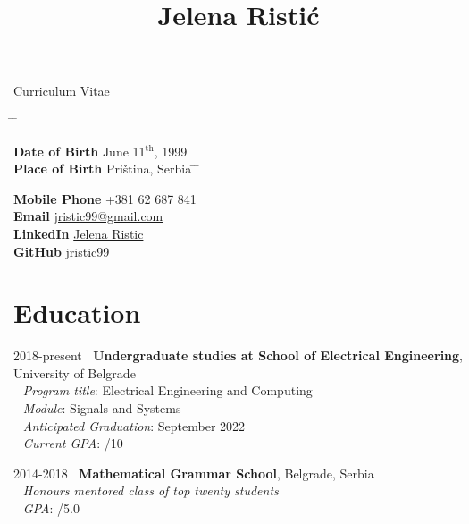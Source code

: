 \documentclass[10pt]{article}
\begin{document}
\pagestyle{empty}

\title{Jelena Ristić} \hfill Curriculum Vitae



\setlength{\TPHorizModule}{1mm}
\setlength{\TPVertModule}{1mm}

\parbox{0.5\textwidth}{ 
\begin{tabbing} 
\hspace{3cm} \= \hspace{1cm} \= \kill 


{\bf Date of Birth} \>  June 11$^\text{th}$, 1999 \\ 
{\bf Place of Birth} \> Priština, Serbia 
\hspace{3cm} \= \hspace{4cm} \= \kill %

{\bf Mobile Phone} \> +381 62 687 841 \\ %
{\bf Email} \> \href{mailto:jristic99@gmail.com}{jristic99@gmail.com} \\ %
{\bf LinkedIn} \> \href{https://www.linkedin.com/in/jristic99/}{Jelena Ristic} \\
{\bf GitHub} \> \href{https://github.com/jristic99}{jristic99}

\end{tabbing}}



\section{Education}
\tabbedblock
{
2018-present \> $\:$  \textbf{Undergraduate studies at School of Electrical Engineering}, University of Belgrade\\[2pt]
\>\+
$\:$ $\:$\textit{Program title}: \> Electrical Engineering and Computing \\
$\:$ $\:$\textit{Module}: \> Signals and Systems \\
$\:$ $\:$\textit{Anticipated Graduation}: \> September 2022 \\
$\:$ $\:$\textit{Current GPA}: /10
}

\tabbedblock
{
2014-2018 \> $\:$ \textbf{Mathematical Grammar School}, Belgrade, Serbia\\[2pt]
\>\+
$\:$ $\:$\textit{Honours mentored class of top twenty students} \>  \\[2pt]
$\:$ $\:$\textit{GPA}: /5.0
}
\end{document}
